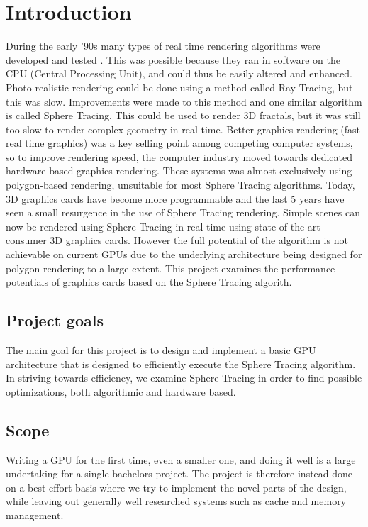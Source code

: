 \chapter{Introduction} 	
	During the early '90s many types of real time rendering algorithms were 
	developed and tested \cite{TODO}. This was possible because they ran in 
	software on the CPU (Central Processing Unit), and could thus be easily altered and enhanced. 
	Photo realistic rendering could be done using a method called Ray Tracing, 
	but this was slow\cite{TODO}. Improvements were made to this method and 
	one similar algorithm is called Sphere Tracing. This could be used to render
	3D fractals\cite{TODO}, but it was still too slow to render complex
	geometry in real time\cite{TODO}. Better graphics rendering (fast real 
	time graphics) was a key selling point among competing computer systems, so 
	to improve rendering speed, the computer industry moved towards dedicated 
	hardware based 	graphics rendering\cite{TODO}. These systems was almost 
	exclusively using polygon-based rendering, unsuitable for most Sphere Tracing 
	algorithms. Today, 3D graphics cards have become more programmable and the 
	last 5 years have seen a small resurgence in the use of Sphere Tracing 
	rendering\cite{TODO}. Simple scenes can now be rendered using Sphere Tracing 
	in real time using state-of-the-art consumer 3D graphics cards. However the 
	full potential of the algorithm is not achievable on current GPUs 
	due to the underlying architecture being designed for polygon rendering to a 
	large extent\cite{TODO}. This project examines the performance potentials of 
	graphics cards based on the Sphere Tracing algorith. 
	
	\section{Project goals}
	
		The main goal for this project is to design and implement a basic GPU 
		architecture that is designed to efficiently execute the Sphere Tracing 
		algorithm. In striving towards efficiency, we examine Sphere Tracing in 
		order to find possible optimizations, both algorithmic and hardware 
		based.
		
	\section{Scope}

		Writing a GPU for the first time, even a smaller one, and doing it well is
		a large undertaking for a single bachelors project. The project is therefore
		instead done on a best-effort basis where we try to implement the novel parts
		of the design, while leaving out generally well researched systems such as
		cache and memory management. 
